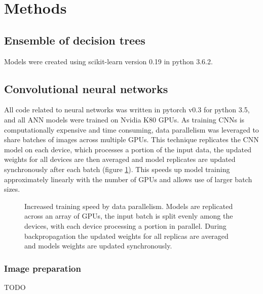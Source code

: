 \documentclass[a4paper,11pt,twoside,openright]{scrbook}
\begin{document}


\section{Methods}


\subsection{Ensemble of decision trees}
Models were created using scikit-learn version 0.19 in python 3.6.2.

\subsection{Convolutional neural networks}


All code related to neural networks was written in pytorch v0.3 for python 3.5, and all ANN models were trained on Nvidia K80 GPUs.
As training CNNs is computationally expensive and time consuming, data parallelism was leveraged to share batches of images across multiple GPUs.
This technique replicates the CNN model on each device, which processes a portion of the input data, the updated weights for all devices are then averaged and model replicates are updated synchronously after each batch (figure \ref{figure:multi_GPU}).
This speeds up model training approximately linearly with the number of GPUs and allows use of larger batch sizes.

\begin{figure}
    \captionsetup{width=0.8\textwidth}
    \caption[Multi-GPU distributed training]{Increased training speed by data parallelism. Models are replicated across an array of GPUs, the input batch is split evenly among the devices, with each device processing a portion in parallel. During backpropagation the updated weights for all replicas are averaged and models weights are updated synchronously.}
    
    \label{figure:multi_GPU}
\end{figure}





\subsubsection{Image preparation}
TODO


\end{document}
